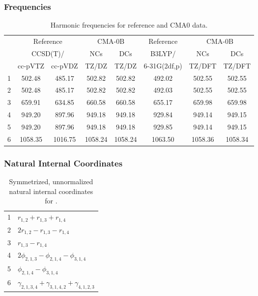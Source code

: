 \documentclass[10pt,oneside]{article}
\begin{document}
\subsubsection*{Frequencies}
\begin{table}[h!]
\centering
\caption{Harmonic frequencies for reference and CMA0 data.}
\begin{tabular}{cccccccc}
\toprule
{} & \multicolumn{2}{c}{Reference} & \multicolumn{2}{c}{CMA-0B} &    Reference & \multicolumn{2}{c}{CMA-0B} \\
{} & \multicolumn{2}{c}{CCSD(T)/} &     NCs &     DCs &       B3LYP/ &     NCs &     DCs \\
{} &   cc-pVTZ & cc-pVDZ &   TZ/DZ &   TZ/DZ & 6-31G(2df,p) &  TZ/DFT &  TZ/DFT \\
\midrule
1 &    502.48 &  485.17 &  502.82 &  502.82 &       492.02 &  502.55 &  502.55 \\
2 &    502.48 &  485.17 &  502.82 &  502.82 &       492.03 &  502.55 &  502.55 \\
3 &    659.91 &  634.85 &  660.58 &  660.58 &       655.17 &  659.98 &  659.98 \\
4 &    949.20 &  897.96 &  949.18 &  949.18 &       929.84 &  949.14 &  949.15 \\
5 &    949.20 &  897.96 &  949.18 &  949.18 &       929.85 &  949.14 &  949.15 \\
6 &   1058.35 & 1016.75 & 1058.24 & 1058.24 &      1063.50 & 1058.36 & 1058.34 \\
\bottomrule
\end{tabular}
\end{table}

\clearpage

\subsubsection*{Natural Internal Coordinates}
\begin{table}[h!]
\centering
\caption{Symmetrized, unnormalized natural internal coordinates for .}
\small
\begin{tabular}{ll}
  1   & $r_{1,2} + r_{1,3} + r_{1,4}$ \\
  2   & $2r_{1,2} - r_{1,3} - r_{1,4}$ \\
  3   & $r_{1,3} - r_{1,4}$ \\
  4   & $2\phi_{2,1,3} - \phi_{2,1,4} - \phi_{3,1,4}$ \\
  5   & $\phi_{2,1,4} - \phi_{3,1,4}$ \\
  6   & $\gamma_{2,1,3,4} + \gamma_{3,1,4,2} + \gamma_{4,1,2,3}$ \\
\end{tabular}
\end{table}
\end{document}
